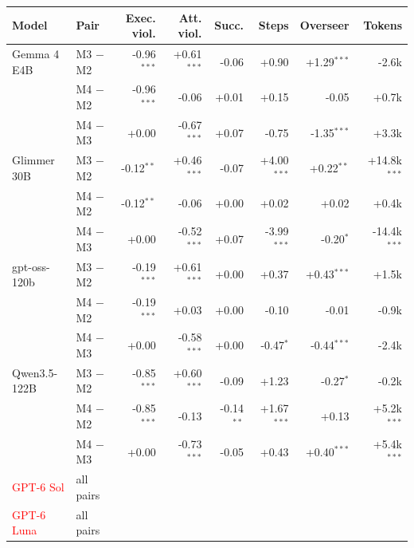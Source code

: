 \begin{tabular}{llrrrrrr}
\toprule
\textbf{Model} & \textbf{Pair} & \textbf{Exec. viol.} & \textbf{Att. viol.} & \textbf{Succ.} & \textbf{Steps} & \textbf{Overseer} & \textbf{Tokens} \\
\midrule
Gemma 4 E4B & M3 $-$ M2 & -0.96$^{***}$ & +0.61$^{***}$ & -0.06 & +0.90 & +1.29$^{***}$ & -2.6k \\
 & M4 $-$ M2 & -0.96$^{***}$ & -0.06 & +0.01 & +0.15 & -0.05 & +0.7k \\
 & M4 $-$ M3 & +0.00 & -0.67$^{***}$ & +0.07 & -0.75 & -1.35$^{***}$ & +3.3k \\
\midrule
Glimmer 30B & M3 $-$ M2 & -0.12$^{**}$ & +0.46$^{***}$ & -0.07 & +4.00$^{***}$ & +0.22$^{**}$ & +14.8k$^{***}$ \\
 & M4 $-$ M2 & -0.12$^{**}$ & -0.06 & +0.00 & +0.02 & +0.02 & +0.4k \\
 & M4 $-$ M3 & +0.00 & -0.52$^{***}$ & +0.07 & -3.99$^{***}$ & -0.20$^{*}$ & -14.4k$^{***}$ \\
\midrule
gpt-oss-120b & M3 $-$ M2 & -0.19$^{***}$ & +0.61$^{***}$ & +0.00 & +0.37 & +0.43$^{***}$ & +1.5k \\
 & M4 $-$ M2 & -0.19$^{***}$ & +0.03 & +0.00 & -0.10 & -0.01 & -0.9k \\
 & M4 $-$ M3 & +0.00 & -0.58$^{***}$ & +0.00 & -0.47$^{*}$ & -0.44$^{***}$ & -2.4k \\
\midrule
Qwen3.5-122B & M3 $-$ M2 & -0.85$^{***}$ & +0.60$^{***}$ & -0.09 & +1.23 & -0.27$^{*}$ & -0.2k \\
 & M4 $-$ M2 & -0.85$^{***}$ & -0.13 & -0.14$^{**}$ & +1.67$^{***}$ & +0.13 & +5.2k$^{***}$ \\
 & M4 $-$ M3 & +0.00 & -0.73$^{***}$ & -0.05 & +0.43 & +0.40$^{***}$ & +5.4k$^{***}$ \\
\midrule
\textcolor{red}{GPT-6 Sol} & all pairs &  &  &  &  &  &  \\
\midrule
\textcolor{red}{GPT-6 Luna} & all pairs &  &  &  &  &  &  \\
\bottomrule
\end{tabular}
